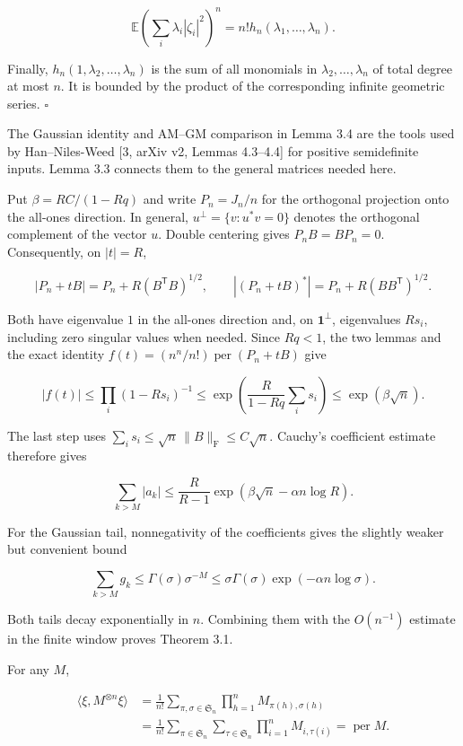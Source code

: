 \documentclass[11pt,a4paper]{article}
\begin{document}
\[
\mathbb E\left(\sum_i\lambda_i|\zeta_i|^2\right)^n
=n!h_n(\lambda_1,\ldots,\lambda_n).
\]

Finally, \(h_n(1,\lambda_2,\ldots,\lambda_n)\) is the sum of all monomials in \(\lambda_2,\ldots,\lambda_n\) of total degree at most \(n\). It is bounded by the product of the corresponding infinite geometric series. \(\square\)

The Gaussian identity and AM--GM comparison in Lemma 3.4 are the tools used by Han--Niles-Weed {[}3, arXiv v2, Lemmas 4.3--4.4{]} for positive semidefinite inputs. Lemma 3.3 connects them to the general matrices needed here.

Put \(\beta=RC/(1-Rq)\) and write \(P_n=J_n/n\) for the orthogonal projection onto the all-ones direction. In general, \(u^\perp=\{v:u^*v=0\}\) denotes the orthogonal complement of the vector \(u\). Double centering gives \(P_nB=BP_n=0\). Consequently, on \(|t|=R\),

\[
|P_n+tB|=P_n+R(B^{\mathsf T}B)^{1/2},
\qquad
|(P_n+tB)^*|=P_n+R(BB^{\mathsf T})^{1/2}.
\]

Both have eigenvalue \(1\) in the all-ones direction and, on \(\mathbf1^\perp\), eigenvalues \(Rs_i\), including zero singular values when needed. Since \(Rq<1\), the two lemmas and the exact identity \(f(t)=(n^n/n!)\operatorname{per}(P_n+tB)\) give

\[
|f(t)|\le\prod_i(1-Rs_i)^{-1}
\le\exp\!\left(\frac{R}{1-Rq}\sum_i s_i\right)
\le\exp(\beta\sqrt n).
\]

The last step uses \(\sum_i s_i\le\sqrt n\,\|B\|_{\mathrm F}\le C\sqrt n\). Cauchy's coefficient estimate therefore gives

\[
\sum_{k>M}|a_k|
\le\frac{R}{R-1}
\exp\!\left(\beta\sqrt n-\alpha n\log R\right).
\]

For the Gaussian tail, nonnegativity of the coefficients gives the slightly weaker but convenient bound

\[
\sum_{k>M}g_k
\le \Gamma(\sigma)\sigma^{-M}
\le\sigma\Gamma(\sigma)\exp\!\left(-\alpha n\log\sigma\right).
\]

Both tails decay exponentially in \(n\). Combining them with the \(O(n^{-1})\) estimate in the finite window proves Theorem 3.1.

For any \(M\),

\[
\begin{aligned}
\langle\xi,M^{\otimes n}\xi\rangle
&=\frac1{n!}\sum_{\pi,\sigma\in \mathfrak S_n}\prod_{h=1}^nM_{\pi(h),\sigma(h)}\\
&=\frac1{n!}\sum_{\pi\in \mathfrak S_n}\sum_{\tau\in \mathfrak S_n}\prod_{i=1}^nM_{i,\tau(i)}
=\operatorname{per}M.
\end{aligned}
\]
\end{document}
